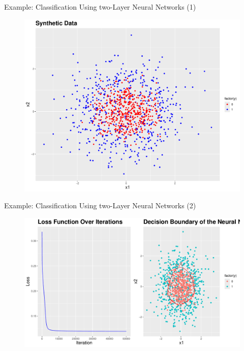 \documentclass[10pt, hyperref={colorlinks = true,linkcolor = blue}]{beamer}
\begin{document}
{{\begin{frame}{Example: Classification Using two-Layer Neural Networks (1)}
\begin{figure}
\includegraphics[width=0.85\linewidth]{figures/classification_examples.pdf}
\end{figure}
\end{frame}


\begin{frame}{Example: Classification Using two-Layer Neural Networks (2)}
\begin{figure}
\includegraphics[width=1\linewidth]{figures/classification_examples_resulst.pdf}
\end{figure}
\end{frame}


}}
\end{document}
